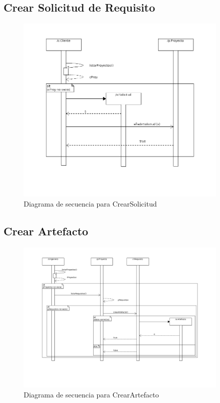 \documentclass[a4paper, spanish]{article}
\begin{document}
\subsection{Crear Solicitud de Requisito} %
\begin{figure}[h!]
\centering
\includegraphics[width=0.9\textwidth]{diagramas/diagramasSecuencia/CrearSolicitud_sd.png}
\caption{Diagrama de secuencia para CrearSolicitud}
\end{figure}


\subsection{Crear Artefacto}
\begin{figure}[h!]
\centering
\includegraphics[width=0.9\textwidth]{diagramas/diagramasSecuencia/CrearArtefacto_sd.png}
\caption{Diagrama de secuencia para CrearArtefacto}
\end{figure}
\end{document}
